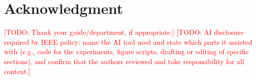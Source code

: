 \documentclass[conference,a4paper]{IEEEtran}
\newcommand{\todo}[1]{\textcolor{red}{[TODO: #1]}}
\begin{document}
\section*{Acknowledgment}
\todo{Thank your guide/department, if appropriate.}
\todo{AI disclosure required by IEEE policy: name the AI tool used and state which parts it assisted with (e.g., code for the experiments, figure scripts, drafting or editing of specific sections), and confirm that the authors reviewed and take responsibility for all content.}



\end{document}
